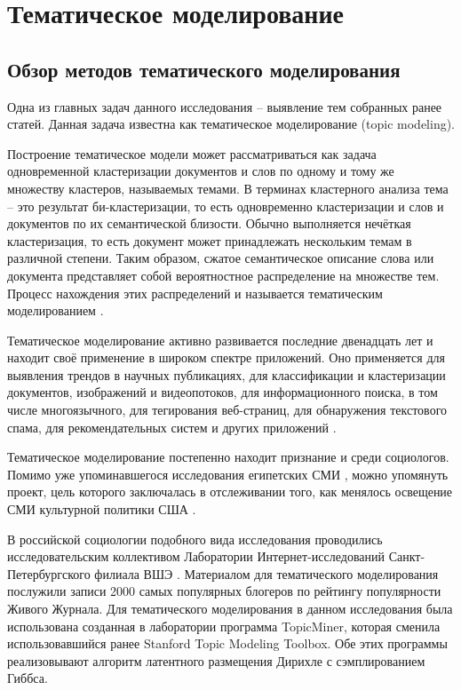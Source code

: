 \section{Тематическое моделирование}

\subsection{Обзор методов тематического моделирования}
Одна из главных задач данного исследования -- выявление тем собранных ранее статей. Данная задача известна как тематическое моделирование (topic modeling).

Построение тематическое модели может рассматриваться как задача одновременной кластеризации документов и слов по одному и тому же множеству кластеров, называемых темами. В терминах кластерного анализа тема -- это результат би-кластеризации, то есть одновременно кластеризации и слов и документов по их семантической близости. Обычно выполняется нечёткая кластеризация, то есть документ может принадлежать нескольким темам в различной степени. Таким образом, сжатое семантическое описание слова или документа представляет собой вероятностное распределение на множестве тем. Процесс нахождения этих распределений и называется тематическим моделированием \cite{korshunov2012}.

Тематическое моделирование активно развивается последние двенадцать лет и находит своё применение в широком спектре приложений. Оно применяется для выявления трендов в научных публикациях, для классификации и кластеризации документов, изображений и видеопотоков, для информационного поиска, в том числе многоязычного, для тегирования веб-страниц, для обнаружения текстового спама, для рекомендательных систем и других приложений \cite[стр. 4]{voroncov2013}. 

Тематическое моделирование постепенно находит признание и среди социологов. Помимо уже упоминавшегося исследования египетских СМИ \cite{EgyptianUprising2012}, можно упомянуть проект, цель которого заключалась в отслеживании того, как менялось освещение СМИ культурной политики США \cite{poetics_topics}.

В российской социологии подобного вида исследования проводились исследовательским коллективом Лаборатории Интернет-исследований Санкт-Петербургского филиала ВШЭ \cite{kolcovalda}. Материалом для тематического моделирования послужили записи 2000 самых популярных блогеров по рейтингу популярности Живого Журнала. Для тематического моделирования в данном исследования была использована созданная в лаборатории программа TopicMiner, которая сменила использовавшийся ранее Stanford Topic Modeling Toolbox. Обе этих программы реализовывают алгоритм латентного размещения Дирихле с сэмплированием Гиббса.

